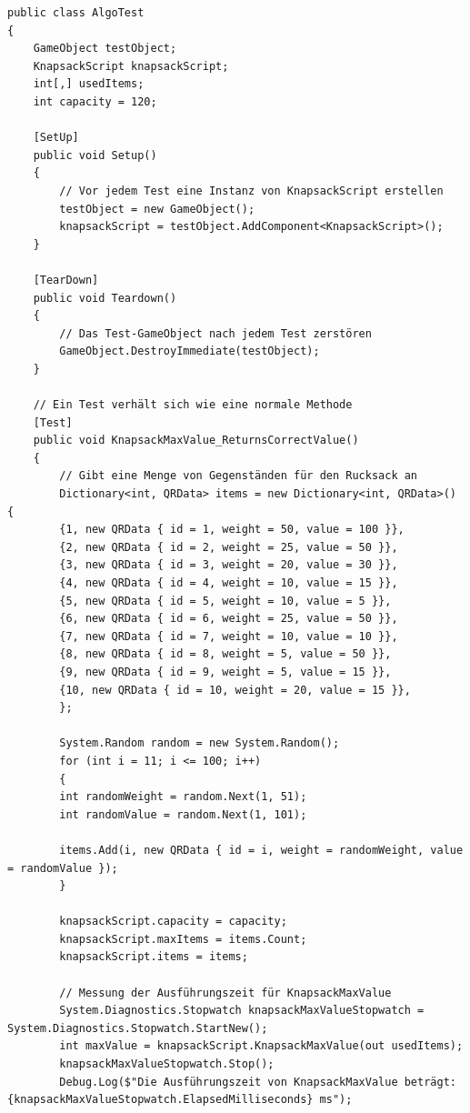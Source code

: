 \begin{lstlisting}[style=csharp, caption={Inventar füllen}, label=code:invFül_PSV]
public class AlgoTest
{
    GameObject testObject;
    KnapsackScript knapsackScript;
    int[,] usedItems;
    int capacity = 120;

    [SetUp]
    public void Setup()
    {
        // Vor jedem Test eine Instanz von KnapsackScript erstellen
        testObject = new GameObject();
        knapsackScript = testObject.AddComponent<KnapsackScript>();
    }

    [TearDown]
    public void Teardown()
    {
        // Das Test-GameObject nach jedem Test zerstören
        GameObject.DestroyImmediate(testObject);
    }

    // Ein Test verhält sich wie eine normale Methode
    [Test]
    public void KnapsackMaxValue_ReturnsCorrectValue()
    {
        // Gibt eine Menge von Gegenständen für den Rucksack an
        Dictionary<int, QRData> items = new Dictionary<int, QRData>() {
        {1, new QRData { id = 1, weight = 50, value = 100 }},
        {2, new QRData { id = 2, weight = 25, value = 50 }},
        {3, new QRData { id = 3, weight = 20, value = 30 }},
        {4, new QRData { id = 4, weight = 10, value = 15 }},
        {5, new QRData { id = 5, weight = 10, value = 5 }},
        {6, new QRData { id = 6, weight = 25, value = 50 }},
        {7, new QRData { id = 7, weight = 10, value = 10 }},
        {8, new QRData { id = 8, weight = 5, value = 50 }},
        {9, new QRData { id = 9, weight = 5, value = 15 }},
        {10, new QRData { id = 10, weight = 20, value = 15 }},
        };

        System.Random random = new System.Random();
        for (int i = 11; i <= 100; i++)
        {
        int randomWeight = random.Next(1, 51);
        int randomValue = random.Next(1, 101);

        items.Add(i, new QRData { id = i, weight = randomWeight, value = randomValue });
        }

        knapsackScript.capacity = capacity;
        knapsackScript.maxItems = items.Count;
        knapsackScript.items = items;

        // Messung der Ausführungszeit für KnapsackMaxValue
        System.Diagnostics.Stopwatch knapsackMaxValueStopwatch = System.Diagnostics.Stopwatch.StartNew();
        int maxValue = knapsackScript.KnapsackMaxValue(out usedItems);
        knapsackMaxValueStopwatch.Stop();
        Debug.Log($"Die Ausführungszeit von KnapsackMaxValue beträgt: {knapsackMaxValueStopwatch.ElapsedMilliseconds} ms");


\end{lstlisting}
